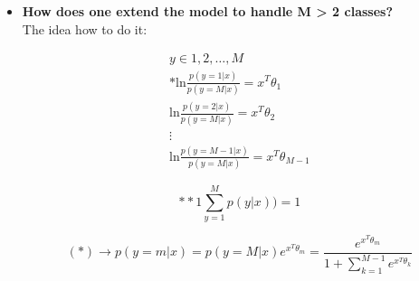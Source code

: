 \begin{itemize}
    \item \textbf{How does one extend the model to handle M > 2 classes?} \\
    The idea how to do it:
    
    \begin{equation}
    \begin{aligned}
    	y \in 1,2,\ldots,M \\ *
    	\text{ln} \frac{p(y=1 | x)} {p(y= M | x)} = x^{T}\theta_1 \\ 
    	\text{ln} \frac{p(y=2 | x)} {p(y= M | x)} = x^{T}\theta_2 \\
    	\vdots \\
    	\text{ln} \frac{p(y=M-1 | x)} {p(y= M | x)} = x^{T}\theta_{M-1}  
    \end{aligned}
    \end{equation}
    
    \begin{equation}
    **1 \sum_{y=1}^{M} p(y |x)) = 1
    \end{equation}
 	
 	\begin{equation}
 	(*)\rightarrow p(y = m |x) = p(y = M |x) e^{x^{T}\theta_m} = \frac{e^{x^{T}\theta_m}} {1 + \sum_{k=1}^{M-1}e^{x^{T}\theta_k} }  
 	\end{equation}

\end{itemize}

